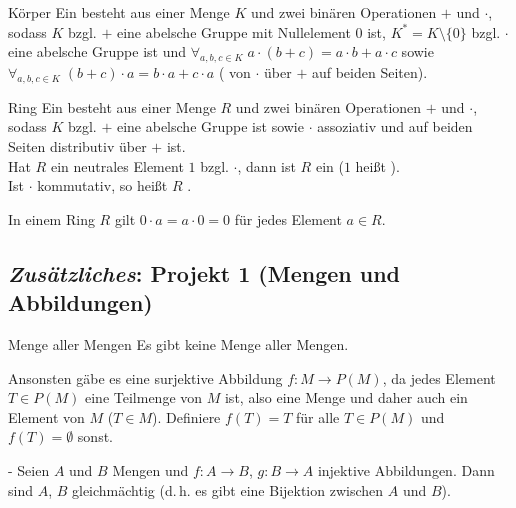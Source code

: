 \begin{Def}{Körper}
    Ein  besteht aus einer Menge $K$ und zwei binären
    Operationen $\boldsymbol{+}$ und $\boldsymbol{\cdot}$, sodass
    $K$ bzgl. $\boldsymbol{+}$ eine abelsche Gruppe mit Nullelement $0$ ist,
    $K^\ast = K \setminus \{0\}$ bzgl. $\boldsymbol{\cdot}$ eine abelsche
    Gruppe ist
    und $\forall_{a, b, c \in K}\; a \cdot (b + c) = a \cdot b + a \cdot c$
    sowie $\forall_{a, b, c \in K}\; (b + c) \cdot a = b \cdot a + c \cdot a$
    ( von $\boldsymbol{\cdot}$ über $\boldsymbol{+}$
    auf beiden Seiten).
\end{Def}

\begin{Def}{Ring}
    Ein  besteht aus einer Menge $R$ und zwei binären Operationen
    $\boldsymbol{+}$ und $\boldsymbol{\cdot}$, sodass
    $K$ bzgl. $\boldsymbol{+}$ eine abelsche Gruppe ist
    sowie $\boldsymbol{\cdot}$ assoziativ und auf beiden Seiten distributiv
    über $\boldsymbol{+}$ ist. \\
    Hat $R$ ein neutrales Element $1$ bzgl. $\boldsymbol{\cdot}$, dann
    ist $R$ ein  ($1$ heißt ). \\
    Ist $\boldsymbol{\cdot}$ kommutativ, so heißt $R$
    .
\end{Def}

\begin{Bem}
    In einem Ring $R$ gilt $0 \cdot a = a \cdot 0 = 0$ für jedes Element
    $a \in R$.
\end{Bem}

\subsection{%
    \emph{Zusätzliches}: Projekt 1 (Mengen und Abbildungen)%
}

\begin{Satz}{Menge aller Mengen}
    Es gibt keine Menge aller Mengen.
\end{Satz}

\begin{Bem}
    Ansonsten gäbe es eine surjektive Abbildung $f: M \rightarrow P(M)$,
    da jedes Element $T \in P(M)$ eine Teilmenge von $M$ ist, also eine Menge
    und daher auch ein Element von $M$ ($T \in M$).
    Definiere $f(T) = T$ für alle $T \in P(M)$ und $f(T) = \emptyset$ sonst.
\end{Bem}

\begin{Satz}{-}
    Seien $A$ und $B$ Mengen und $f: A \rightarrow B$, $g: B \rightarrow A$
    injektive Abbildungen.
    Dann sind $A$, $B$ gleichmächtig (d.\,h. es gibt eine Bijektion zwischen
    $A$ und $B$).
\end{Satz}

\pagebreak
